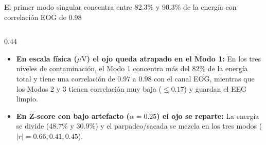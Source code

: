 \documentclass[aspectratio=169,9pt]{beamer}
\begin{document}
\begin{frame}{El primer modo singular concentra entre 82.3\% y 90.3\% de la energ\'ia con correlaci\'on EOG de 0.98}
\begin{columns}[T,onlytextwidth]
\begin{column}{0.44\textwidth}
      \vspace{0.08cm}

      \begin{tcolorbox}[navycard, title={\scriptsize\bfseries ?`Qu\'e nos dicen estos n\'umeros?}, colbacktitle=UDNavy, coltitle=white]
        \scriptsize
        \begin{itemize}
          \item \textbf{En escala f\'isica ($\mu\text{V}$) el ojo queda atrapado en el Modo 1:} En los tres niveles de contaminaci\'on, el Modo 1 concentra m\'as del $82\%$ de la energ\'ia total y tiene una correlaci\'on de $0.97\text{ a }0.98$ con el canal EOG, mientras que los Modos 2 y 3 tienen correlaci\'on muy baja ($\le 0.17$) y guardan el EEG limpio.
          \item \textbf{En Z-score con bajo artefacto ($\alpha=0.25$) el ojo se reparte:} La energ\'ia se divide ($48.7\%$ y $30.9\%$) y el parpadeo/sacada se mezcla en los tres modos ($|r|=0.66, 0.41, 0.45$).
        \end{itemize}
      \end{tcolorbox}
    \end{column}
  \end{columns}
\end{frame}
\end{document}
